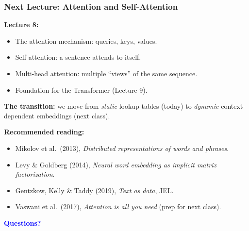 \documentclass[notes,11pt, aspectratio=169]{beamer}
\begin{document}
\begin{frame}
\frametitle{Next Lecture: Attention and Self-Attention}

\textbf{Lecture 8:}
\begin{itemize}
    \item The attention mechanism: queries, keys, values.
    \item Self-attention: a sentence attends to itself.
    \item Multi-head attention: multiple ``views'' of the same sequence.
    \item Foundation for the Transformer (Lecture 9).
\end{itemize}

\vspace{8pt}
\textbf{The transition:} we move from \emph{static} lookup tables (today) to \emph{dynamic} context-dependent embeddings (next class).

\vspace{8pt}
\textbf{Recommended reading:}
\begin{itemize}
    \item Mikolov et al.\ (2013), \emph{Distributed representations of words and phrases}.
    \item Levy \& Goldberg (2014), \emph{Neural word embedding as implicit matrix factorization}.
    \item Gentzkow, Kelly \& Taddy (2019), \emph{Text as data}, JEL.
    \item Vaswani et al.\ (2017), \emph{Attention is all you need} (prep for next class).
\end{itemize}

\vspace{6pt}
\begin{center}
\Large \textcolor{blue}{\textbf{Questions?}}
\end{center}
\end{frame}
\end{document}
